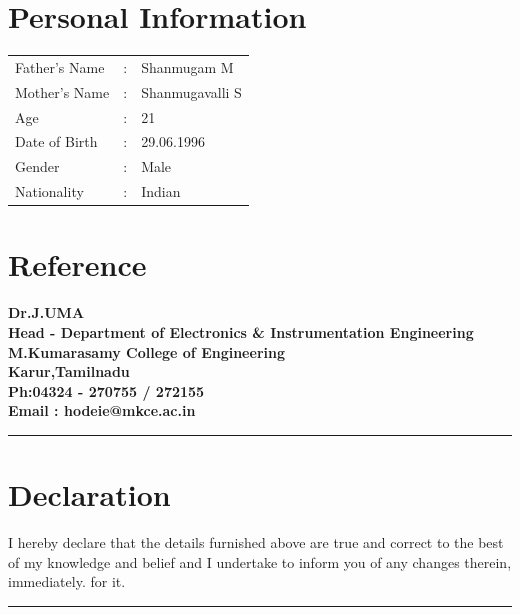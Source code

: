 \documentclass[a4paper,12pt,line]{article}
\begin{document}
	\vspace*{1.5cm}
	
	\newpage
	
	\begin{flushleft}
		\section*{{\color{magenta}Personal Information}}
		\begin{tabular}{lcl}
			Father's Name&:&Shanmugam M\\
			Mother's Name&:&Shanmugavalli S\\
			Age&:&21\\
			Date of Birth&:&29.06.1996\\
			Gender&:&Male\\
			Nationality&:&Indian\\
		\end{tabular}
	
	
	\section*{{\color{magenta}Reference}}
	\textbf{
		Dr.J.UMA\\
		Head - Department of Electronics \& Instrumentation Engineering\\
		M.Kumarasamy College of Engineering\\
		Karur,Tamilnadu\\
		Ph:04324 - 270755 / 272155\\
		Email : hodeie@mkce.ac.in\\}
	
	{\color{rd} \rule{\linewidth}{0.8mm} }%
	\vspace{-1.5cm}
	\section*{{\color{magenta}Declaration}}
	
	\hspace{1cm}I hereby declare that the details furnished above are true and correct to the best of my knowledge
	and belief and I undertake to inform you of any changes therein, immediately.
	for it. 
	\vspace{5mm}
	{\color{rd} \rule{\linewidth}{1mm} }
	\end{flushleft}
\end{document}
